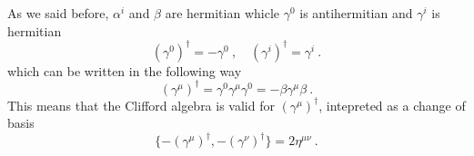     As we said before, $\alpha^i$ and $\beta$ are hermitian whicle $\gamma^0$ is antihermitian and $\gamma^i$ is hermitian 
    \begin{equation*}
        (\gamma^0)^\dagger = - \gamma^0 ~, \quad (\gamma^i)^\dagger = \gamma^i ~.
    \end{equation*}
    which can be written in the following way 
    \begin{equation*}
        (\gamma^\mu)^\dagger = \gamma^0 \gamma^\mu \gamma^0 = - \beta \gamma^\mu \beta ~.
    \end{equation*}
    This means that the Clifford algebra is valid for $(\gamma^\mu)^\dagger$, intepreted as a change of basis 
    \begin{equation*}
        \{- (\gamma^\mu)^\dagger, - (\gamma^\nu)^\dagger \} = 2 \eta^{\mu\nu} ~.
    \end{equation*}
